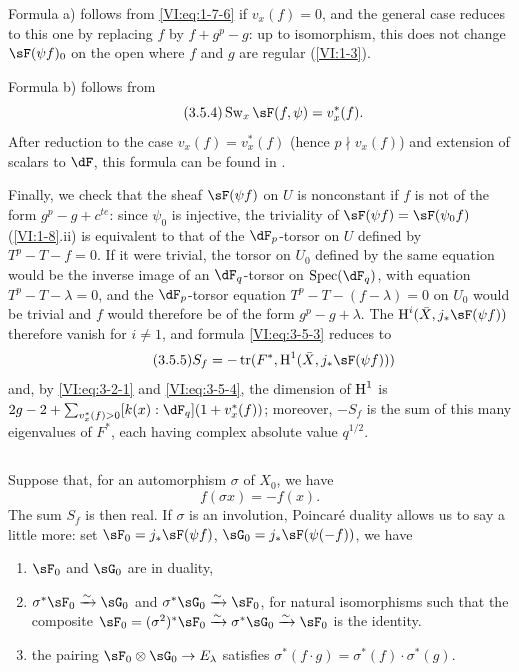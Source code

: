 Formula a) follows from \eqref{VI:eq:1-7-6} if $v_x(f)=0$, and the general 
case reduces to this one by replacing $f$ by $f+g^p-g$: up to isomorphism, this 
does not change $\sF(\psi f)_0$ on the open where $f$ and $g$ are regular 
(\ref{VI:1-3}). 

Formula b) follows from 
\begin{equation*}\tag{3.5.4}\label{VI:eq:3-5-4}
  \swan_x \sF(f,\psi) = v_x^\ast(f) \text{.} 
\end{equation*}
After reduction to the case $v_x(f)=v_x^\ast(f)$ (hence $p\nmid v_x(f)$) 
and extension of scalars to $\dF$, this formula can be found in 
\cite[4.4]{se61}.

Finally, we check that the sheaf $\sF(\psi f)$ on $U$ is nonconstant if 
$f$ is not of the form $g^p-g+c^{t e}$: since $\psi_0$ is injective, the 
triviality of $\sF(\psi f)=\sF(\psi_0 f)$ (\ref{VI:1-8}.ii) is equivalent to 
that of the $\dF_p$-torsor on $U$ defined by $T^p-T-f=0$. If it were trivial, 
the torsor on $U_0$ defined by the same equation would be the inverse image of an 
$\dF_q$-torsor on $\spec(\dF_q)$, with equation $T^p-T-\lambda=0$, and the 
$\dF_p$-torsor equation $T^p-T-(f-\lambda)=0$ on $U_0$ would be trivial 
and $f$ would therefore be of the form $g^p-g+\lambda$. The 
$\h^i(\bar X,j_\ast \sF(\psi f))$ therefore vanish for $i\ne 1$, and formula 
\eqref{VI:eq:3-5-3} reduces to 
\begin{equation*}\tag{3.5.5}\label{VI:eq:3-5-5}
  S_f = -\tr(F^\ast,\h^1(\bar X,j_\ast \sF(\psi f))) 
\end{equation*}
and, by \eqref{VI:eq:3-2-1} and \eqref{VI:eq:3-5-4}, the dimension of $\operatorname{H}^1$ is 
$2 g-2+\sum_{v_x^\ast(f)>0} [k(x):\dF_q](1+v_x^\ast(f))$; moreover, $-S_f$ 
is the sum of this many eigenvalues of $F^\ast$, each having complex 
absolute value $q^{1/2}$. 





\subsection{}\label{VI:3-6}

Suppose that, for an automorphism $\sigma$ of $X_0$, we have 
\[
  f(\sigma x) = - f(x) \text{.} 
\]
The sum $S_f$ is then real. If $\sigma$ is an involution, Poincaré 
duality allows us to say a little more: set 
$\sF_0=j_\ast \sF(\psi f)$, $\sG_0 = j_\ast \sF(\psi(-f))$, we have 
\begin{enumerate}[\indent a)]
  \item $\sF_0$ and $\sG_0$ are in duality, 
  \item $\sigma^\ast \sF_0 \iso \sG_0$ and $\sigma^\ast \sG_0 \iso \sF_0$, for 
    natural isomorphisms such that the composite 
    $\sF_0=(\sigma^2)^\ast \sF_0 \iso \sigma^\ast \sG_0 \iso \sF_0$ 
    is the identity. 
  \item the pairing $\sF_0\otimes \sG_0 \to E_\lambda$ satisfies 
    $\sigma^\ast(f\cdot g) = \sigma^\ast(f) \cdot \sigma^\ast (g)$. 
\end{enumerate} 

